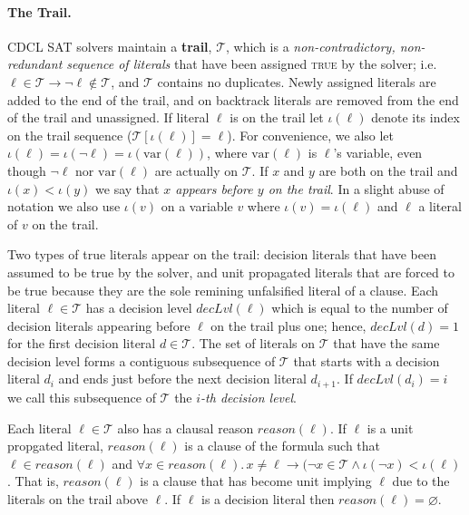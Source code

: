 \documentclass[runningheads]{llncs}
\newcommand{\sat}{SAT\xspace}
\newcommand{\trail}{\ensuremath{\mathcal{T}}}
\newcommand{\trailIdx}[1]{\ensuremath{\iota(#1)}}
\newcommand{\dlevel}[1]{\ensuremath{\mathit{decLvl}(#1)}}
\newcommand{\var}{\text{var}}
\newcommand{\true}{\textsc{true}\xspace}
\newcommand{\reason}[1]{\ensuremath{\mathit{reason}(#1)}}
\renewcommand{\implies}{\rightarrow}
\begin{document}
\paragraph{The Trail.}
CDCL \sat solvers maintain a \textbf{trail}, $\trail$, which is a
\textit{non-contradictory, non-redundant sequence of literals} that
have been assigned \true by the solver; i.e.
$\ell\in\trail \implies \lnot\ell \not\in\trail$, and $\trail$
contains no duplicates. Newly assigned literals are added to the end
of the trail, and on backtrack literals are removed from the end of
the trail and unassigned.  If literal $\ell$ is on the trail let
$\trailIdx{\ell}$ denote its index on the trail sequence
($\trail[\trailIdx{\ell}] = \ell$). For convenience, we also let
$\trailIdx{\ell} = \trailIdx{\lnot \ell} = \trailIdx{\var(\ell)}$,
where $\var(\ell)$ is $\ell$'s variable, even though $\lnot \ell$ nor
$\var(\ell)$ are actually on $\trail$. If $x$ and $y$ are both on the
trail and $\trailIdx{x} < \trailIdx{y}$ we say that \textit{$x$
  appears before $y$ on the trail}. In a slight abuse of notation we
also use $\trailIdx{v}$ on a variable $v$ where
$\trailIdx{v}=\trailIdx{\ell}$ and $\ell$ a literal of $v$ on the
trail.

Two types of true literals appear on the trail: decision literals that
have been assumed to be true by the solver, and unit propagated
literals that are forced to be true because they are the sole remining
unfalsified literal of a clause. Each literal $\ell\in\trail$ has a
decision level $\dlevel{\ell}$ which is equal to the number of
decision literals appearing before $\ell$ on the trail plus one;
hence, $\dlevel{d}=1$ for the first decision literal $d\in\trail$.
The set of literals on $\trail$ that have the same decision level
forms a contiguous subsequence of $\trail$ that starts with a decision
literal $d_i$ and ends just before the next decision literal
$d_{i+1}$. If $\dlevel{d_i} = i$ we call this subsequence of $\trail$
the \textit{$i$-th decision level}.

Each literal $\ell\in\trail$ also has a clausal reason
$\reason{\ell}$. If $\ell$ is a unit propgated literal,
$\reason{\ell}$ is a clause of the formula such that
$\ell \in \reason{\ell}$ and
$\forall x \in \reason{\ell}.\, x\neq \ell \implies (\lnot x \in
\trail \land \trailIdx{\lnot x} < \trailIdx{\ell}$. That is,
$\reason{\ell}$ is a clause that has become unit implying $\ell$ due
to the literals on the trail above $\ell$. If $\ell$ is a decision
literal then $\reason{\ell} = \varnothing$.
\end{document}

